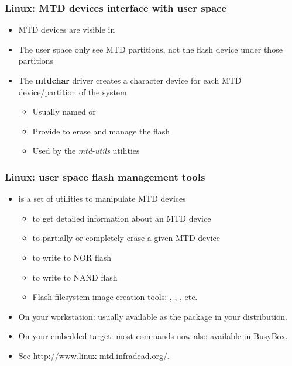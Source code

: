 \begin{frame}
  \frametitle{Linux: MTD devices interface with user space}
  \begin{itemize}
  \item MTD devices are visible in 
  \item The user space only see MTD partitions, not the flash device
    under those partitions
  \item The {\bf mtdchar} driver creates a character device for each
    MTD device/partition of the system
    \begin{itemize}
    \item Usually named  or 
    \item Provide  to erase and manage the flash
    \item Used by the {\em mtd-utils} utilities
    \end{itemize}
  \end{itemize}
\end{frame}

\begin{frame}
  \frametitle{Linux: user space flash management tools}
  \begin{itemize}
  \item {} is a set of utilities to manipulate MTD devices
    \begin{itemize}
    \item {} to get detailed information about an MTD device
    \item {} to partially or completely erase a given
      MTD device
    \item {} to write to NOR flash
    \item {} to write to NAND flash
    \item Flash filesystem image creation tools: ,
      , , etc.
    \end{itemize}
  \item On your workstation: usually available as the 
      package in your distribution.
  \item On your embedded target: most commands now also available
      in BusyBox.
  \item See \url{http://www.linux-mtd.infradead.org/}.
  \end{itemize}
\end{frame}


